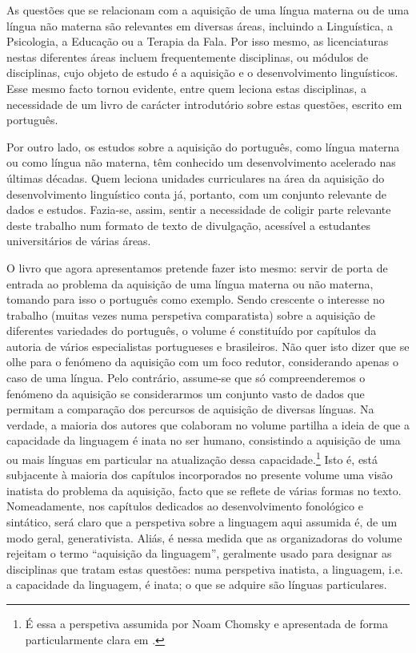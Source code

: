 \begin{refsection}

As questões que se relacionam com a aquisição de uma língua materna ou de uma língua não materna são relevantes em diversas áreas, incluindo a Linguística, a Psicologia, a Educação ou a Terapia da Fala. Por isso mesmo, as licenciaturas nestas diferentes áreas incluem frequentemente disciplinas, ou módulos de disciplinas, cujo objeto de estudo é a aquisição e o desenvolvimento linguísticos. Esse mesmo facto tornou evidente, entre quem leciona estas disciplinas, a necessidade de um livro de carácter introdutório sobre estas questões, escrito em português.

Por outro lado, os estudos sobre a aquisição do português, como língua materna ou como língua não materna, têm conhecido um desenvolvimento acelerado nas últimas décadas. Quem leciona unidades curriculares na área da aquisição do desenvolvimento linguístico conta já, portanto, com um conjunto relevante de dados e estudos. Fazia-se, assim, sentir a necessidade de coligir parte relevante deste trabalho num formato de texto de divulgação, acessível a estudantes universitários de várias áreas. 

O livro que agora apresentamos pretende fazer isto mesmo: servir de porta de entrada ao problema da aquisição de uma língua materna ou não materna, tomando para isso o português como exemplo. Sendo crescente o interesse no trabalho (muitas vezes numa perspetiva comparatista) sobre a aquisição de diferentes variedades do português, o volume é constituído por capítulos da autoria de vários especialistas portugueses e brasileiros. Não quer isto dizer que se olhe para o fenómeno da aquisição com um foco redutor, considerando apenas o caso de uma língua. Pelo contrário, assume-se que só compreenderemos o fenómeno da aquisição se considerarmos um conjunto vasto de dados que permitam a comparação dos percursos de aquisição de diversas línguas. Na verdade, a maioria dos autores que colaboram no volume partilha a ideia de que a capacidade da linguagem é inata no ser humano, consistindo a aquisição de uma ou mais línguas em particular na atualização dessa capacidade.\footnote{É essa a perspetiva assumida por Noam Chomsky e apresentada de forma particularmente clara em \citet{chomsky1986}.} Isto é, está subjacente à maioria dos capítulos incorporados no presente volume uma visão inatista do problema da aquisição, facto que se reflete de várias formas no texto. Nomeadamente, nos capítulos dedicados ao desenvolvimento fonológico e sintático, será claro que a  perspetiva sobre a linguagem aqui assumida é, de um modo geral, generativista. Aliás, é nessa medida que as organizadoras do volume rejeitam o termo ``aquisição da linguagem'', geralmente usado para designar as disciplinas que tratam estas questões: numa perspetiva inatista, a linguagem, i.e. a capacidade da linguagem, é inata; o que se adquire são línguas particulares.


\end{refsection}
